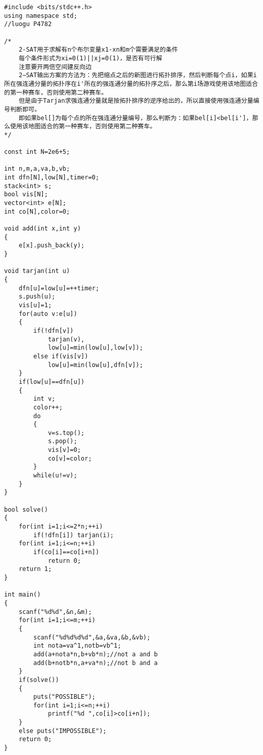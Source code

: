\begin{lstlisting}
#include <bits/stdc++.h>
using namespace std;
//luogu P4782

/*
	2-SAT用于求解有n个布尔变量x1-xn和m个需要满足的条件
	每个条件形式为xi=0(1)||xj=0(1)，是否有可行解
	注意要开两倍空间建反向边
	2−SAT输出方案的方法为：先把缩点之后的新图进行拓扑排序，然后判断每个点i，如果i所在强连通分量的拓扑序在i'所在的强连通分量的拓扑序之后，那么第i场游戏使用该地图适合的第一种赛车，否则使用第二种赛车。
	但是由于Tarjan求强连通分量就是按拓扑排序的逆序给出的，所以直接使用强连通分量编号判断即可。
	即如果bel[]为每个点的所在强连通分量编号，那么判断为：如果bel[i]<bel[i']，那么使用该地图适合的第一种赛车，否则使用第二种赛车。
*/

const int N=2e6+5;

int n,m,a,va,b,vb;
int dfn[N],low[N],timer=0;
stack<int> s;
bool vis[N];
vector<int> e[N];
int co[N],color=0;

void add(int x,int y)
{
	e[x].push_back(y);
}

void tarjan(int u)
{
	dfn[u]=low[u]=++timer;
	s.push(u);
	vis[u]=1;
	for(auto v:e[u])
	{
		if(!dfn[v])
			tarjan(v),
			low[u]=min(low[u],low[v]);
		else if(vis[v])
			low[u]=min(low[u],dfn[v]);
	}
	if(low[u]==dfn[u])
	{
		int v;
		color++;
		do
		{
			v=s.top();
			s.pop();
			vis[v]=0;
			co[v]=color;
		}
		while(u!=v);
	}
}

bool solve()
{
	for(int i=1;i<=2*n;++i)
		if(!dfn[i]) tarjan(i);
	for(int i=1;i<=n;++i)
		if(co[i]==co[i+n])
			return 0;
	return 1;
}

int main()
{
	scanf("%d%d",&n,&m);
	for(int i=1;i<=m;++i)
	{
		scanf("%d%d%d%d",&a,&va,&b,&vb);
		int nota=va^1,notb=vb^1;
		add(a+nota*n,b+vb*n);//not a and b
		add(b+notb*n,a+va*n);//not b and a
	}
	if(solve())
	{
		puts("POSSIBLE");
		for(int i=1;i<=n;++i)
			printf("%d ",co[i]>co[i+n]);
	}
	else puts("IMPOSSIBLE");
	return 0;
}
\end{lstlisting}
